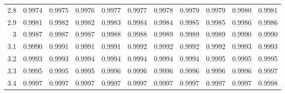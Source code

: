 \begin{center}
\begin{minipage}{5in}
\begin{center}
\begin{tabular}{|r|rrrrrrrrrr|}
	\cellcolor{lightgray}2.8	&\cellcolor{lightgray}	0.9974	&\cellcolor{lightgray}	0.9975	&\cellcolor{lightgray}	0.9976	&\cellcolor{lightgray}	0.9977	&\cellcolor{lightgray}	0.9977	&\cellcolor{lightgray}	0.9978	&\cellcolor{lightgray}	0.9979	&\cellcolor{lightgray}	0.9979	&\cellcolor{lightgray}	0.9980	&\cellcolor{lightgray}	0.9981	\\
	\cellcolor{lightgray}2.9	&\cellcolor{lightgray}	0.9981	&\cellcolor{lightgray}	0.9982	&\cellcolor{lightgray}	0.9982	&\cellcolor{lightgray}	0.9983	&\cellcolor{lightgray}	0.9984	&\cellcolor{lightgray}	0.9984	&\cellcolor{lightgray}	0.9985	&\cellcolor{lightgray}	0.9985	&\cellcolor{lightgray}	0.9986	&\cellcolor{lightgray}	0.9986	\\
	3	&	0.9987	&	0.9987	&	0.9987	&	0.9988	&	0.9988	&	0.9989	&	0.9989	&	0.9989	&	0.9990	&	0.9990	\\
	3.1	&	0.9990	&	0.9991	&	0.9991	&	0.9991	&	0.9992	&	0.9992	&	0.9992	&	0.9992	&	0.9993	&	0.9993	\\
	3.2	&	0.9993	&	0.9993	&	0.9994	&	0.9994	&	0.9994	&	0.9994	&	0.9994	&	0.9995	&	0.9995	&	0.9995	\\
	3.3	&	0.9995	&	0.9995	&	0.9995	&	0.9996	&	0.9996	&	0.9996	&	0.9996	&	0.9996	&	0.9996	&	0.9997	\\
	3.4	&	0.9997	&	0.9997	&	0.9997	&	0.9997	&	0.9997	&	0.9997	&	0.9997	&	0.9997	&	0.9997	&	0.9998	\\\hline

\end{tabular}


\end{center}
\end{minipage}
\end{center}
